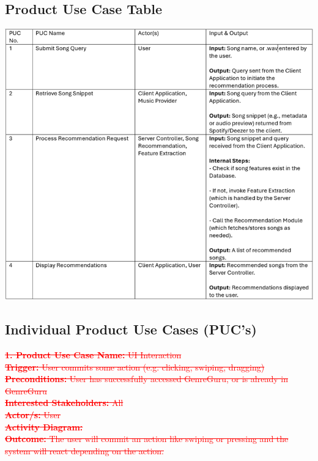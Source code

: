 \documentclass[12pt]{article}
\begin{document}
\subsection{Product Use Case Table}
\includegraphics[width=\textwidth]{PUCTable.png} \\

\subsection{Individual Product Use Cases (PUC's)}
\textcolor{red}{\sout{\textbf{1. Product Use Case Name:} UI Interaction}} \\
\textcolor{red}{\sout{\textbf{Trigger:} User commits some action (e.g. clicking, swiping, dragging)}} \\
\textcolor{red}{\sout{\textbf{Preconditions:} User has successfully accessed GenreGuru, or is already in GenreGuru}} \\
\textcolor{red}{\sout{\textbf{Interested Stakeholders:} All}} \\
\textcolor{red}{\sout{\textbf{Actor/s:} User}} \\
\textcolor{red}{\sout{\textbf{Activity Diagram:}}} \\
\textcolor{red}{\sout{\textbf{Outcome:} The user will commit an action like swiping or pressing and the system will react depending on the action.}}
\end{document}
